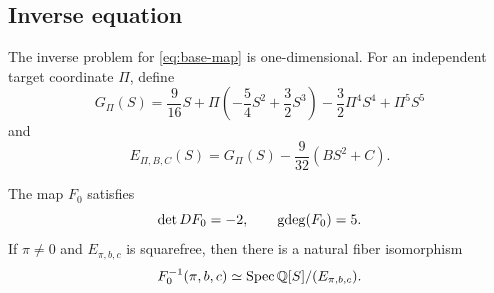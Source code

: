 \subsection{Inverse equation}

The inverse problem for \eqref{eq:base-map} is one-dimensional.  For an independent
target coordinate \(\Pi\), define
\begin{equation}
 G_\Pi(S)=\frac9{16}S
 +\Pi\left(-\frac54S^2+\frac32S^3\right)
 -\frac32\Pi^4S^4+\Pi^5S^5\label{eq:g-pi}
\end{equation}
and
\begin{equation}
 E_{\Pi,B,C}(S)
 =G_\Pi(S)-\frac9{32}(BS^2+C).\label{eq:inverse-equation}
\end{equation}

\begin{proposition}\label{prop:gauge}
The map \(F_0\) satisfies
\begin{equation}
 \det DF_0=-2,\qquad \operatorname{gdeg}(F_0)=5.\label{eq:base-invariants}
\end{equation}
If \(\pi\ne0\) and \(E_{\pi,b,c}\) is squarefree, then there is a natural
fiber isomorphism
\begin{equation}
 F_0^{-1}(\pi,b,c)
 \simeq\operatorname{Spec}\mathbb Q[S]/(E_{\pi,b,c}).\label{eq:base-fiber}
\end{equation}
\end{proposition}

